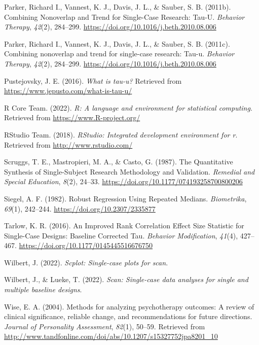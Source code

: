 \documentclass[
  letterpaper,
  DIV=11,
  numbers=noendperiod]{scrreprt}
\newlength{\cslhangindent}
\newlength{\cslentryspacingunit} %
\newenvironment{CSLReferences}[2] %
 {%
  \setlength{\parindent}{0pt}
  \ifodd #1
  \let\oldpar\par
  \def\par{\hangindent=\cslhangindent\oldpar}
  \fi
  \setlength{\parskip}{#2\cslentryspacingunit}
 }%
 {}
\begin{document}
\begin{CSLReferences}{1}{0}
\leavevmode{}%
Parker, Richard I., Vannest, K. J., Davis, J. L., \& Sauber, S. B.
(2011b). Combining {Nonoverlap} and {Trend} for {Single}-{Case}
{Research}: {Tau}-{U}. \emph{Behavior Therapy}, \emph{42}(2), 284--299.
\url{https://doi.org/10.1016/j.beth.2010.08.006}

\leavevmode{}%
Parker, Richard I., Vannest, K. J., Davis, J. L., \& Sauber, S. B.
(2011c). Combining nonoverlap and trend for single-case research: Tau-u.
\emph{Behavior Therapy}, \emph{42}(2), 284--299.
\url{https://doi.org/10.1016/j.beth.2010.08.006}

\leavevmode{}%
Pustejovsky, J. E. (2016). \emph{What is tau-u?} Retrieved from
\url{https://www.jepusto.com/what-is-tau-u/}

\leavevmode{}%
R Core Team. (2022). \emph{R: A language and environment for statistical
computing}. Retrieved from \url{https://www.R-project.org/}

\leavevmode{}%
RStudio Team. (2018). \emph{RStudio: Integrated development environment
for r}. Retrieved from \url{http://www.rstudio.com/}

\leavevmode{}%
Scruggs, T. E., Mastropieri, M. A., \& Casto, G. (1987). The
{Quantitative} {Synthesis} of {Single}-{Subject} {Research}
{Methodology} and {Validation}. \emph{Remedial and Special Education},
\emph{8}(2), 24--33. \url{https://doi.org/10.1177/074193258700800206}

\leavevmode{}%
Siegel, A. F. (1982). Robust {Regression Using Repeated Medians}.
\emph{Biometrika}, \emph{69}(1), 242--244.
\url{https://doi.org/10.2307/2335877}

\leavevmode{}%
Tarlow, K. R. (2016). An {Improved Rank Correlation Effect Size
Statistic} for {Single}-{Case Designs}: Baseline {Corrected Tau}.
\emph{Behavior Modification}, \emph{41}(4), 427--467.
\url{https://doi.org/10.1177/0145445516676750}

\leavevmode{}%
Wilbert, J. (2022). \emph{Scplot: Single-case plots for scan}.

\leavevmode{}%
Wilbert, J., \& Lueke, T. (2022). \emph{Scan: Single-case data analyses
for single and multiple baseline designs}.

\leavevmode{}%
Wise, E. A. (2004). Methods for analyzing psychotherapy outcomes: {A}
review of clinical significance, reliable change, and recommendations
for future directions. \emph{Journal of Personality Assessment},
\emph{82}(1), 50--59. Retrieved from
\url{http://www.tandfonline.com/doi/abs/10.1207/s15327752jpa8201_10}

\end{CSLReferences}
\end{document}
